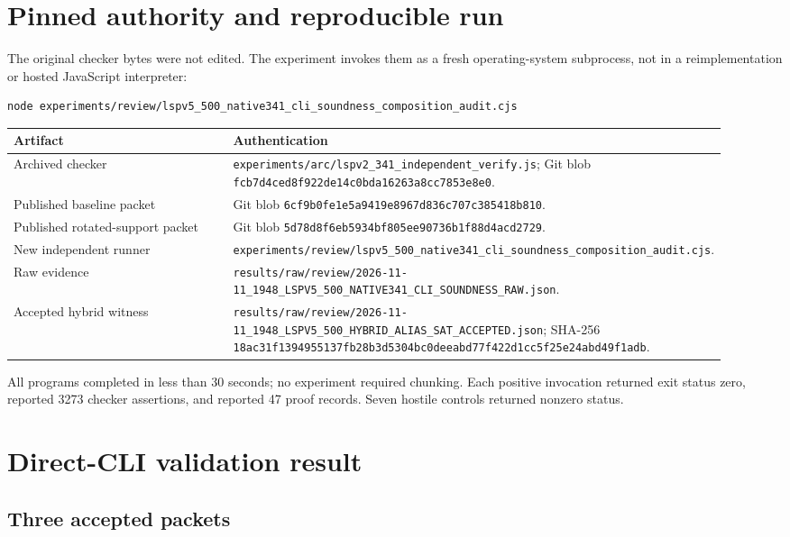 \documentclass[11pt]{article}
\begin{document}
\section{Pinned authority and reproducible run}

The original checker bytes were not edited.  The experiment invokes them as a
fresh operating-system subprocess, not in a reimplementation or hosted
JavaScript interpreter:
\begin{verbatim}
node experiments/review/lspv5_500_native341_cli_soundness_composition_audit.cjs
\end{verbatim}

\begin{longtable}{p{0.32\linewidth}p{0.60\linewidth}}
\toprule
Artifact & Authentication \\
\midrule
\endhead
Archived checker &
\texttt{experiments/arc/lspv2\_341\_independent\_verify.js}; Git blob
\texttt{fcb7d4ced8f922de14c0bda16263a8cc7853e8e0}.\\
Published baseline packet & Git blob
\texttt{6cf9b0fe1e5a9419e8967d836c707c385418b810}.\\
Published rotated-support packet & Git blob
\texttt{5d78d8f6eb5934bf805ee90736b1f88d4acd2729}.\\
New independent runner &
\texttt{experiments/review/lspv5\_500\_native341\_cli\_soundness\_composition\_audit.cjs}.\\
Raw evidence &
\texttt{results/raw/review/2026-11-11\_1948\_LSPV5\_500\_NATIVE341\_CLI\_SOUNDNESS\_RAW.json}.\\
Accepted hybrid witness &
\texttt{results/raw/review/2026-11-11\_1948\_LSPV5\_500\_HYBRID\_ALIAS\_SAT\_ACCEPTED.json};
SHA-256 \texttt{18ac31f1394955137fb28b3d5304bc0deeabd77f422d1cc5f25e24abd49f1adb}.\\
\bottomrule
\end{longtable}

All programs completed in less than 30 seconds; no experiment required
chunking.  Each positive invocation returned exit status zero, reported 3273
checker assertions, and reported 47 proof records.  Seven hostile controls
returned nonzero status.

\section{Direct-CLI validation result}

\subsection{Three accepted packets}
\end{document}
